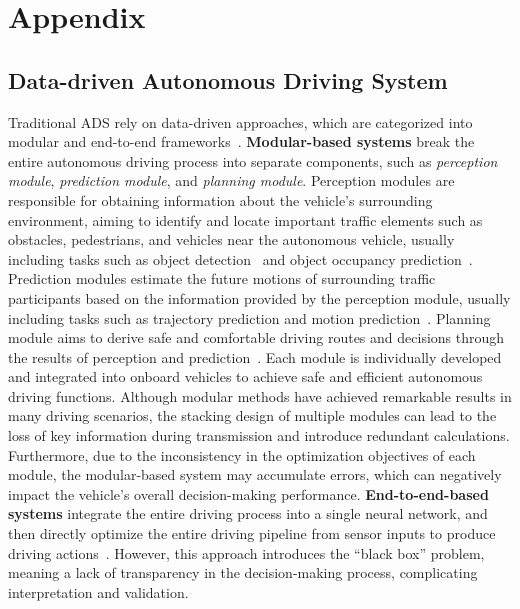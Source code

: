 \section{Appendix}
\label{sec:appendix}

\subsection{Data-driven Autonomous Driving System}
\label{app:Data-driven}
Traditional ADS rely on data-driven approaches, which are categorized into modular and end-to-end frameworks~\cite{chen2024end}. 
\textbf{Modular-based systems} break the entire autonomous driving process into separate components, such as \textit{perception module}, \textit{prediction module}, and \textit{planning module}.
Perception modules are responsible for obtaining information about the vehicle's surrounding environment, aiming to identify and locate important traffic elements such as obstacles, pedestrians, and vehicles near the autonomous vehicle, usually including tasks such as object detection~\cite{wang2021detrd} and object occupancy prediction~\cite{tong2023scene}.
Prediction modules estimate the future motions of surrounding traffic participants based on the information provided by the perception module, usually including tasks such as trajectory prediction and motion prediction~\cite{shi2022motion}.
Planning module aims to derive safe and comfortable driving routes and decisions through the results of perception and prediction~\cite{sauer2018conditional}.
Each module is individually developed and integrated into onboard vehicles to achieve safe and efficient autonomous driving functions. 
Although modular methods have achieved remarkable results in many driving scenarios, the stacking design of multiple modules can lead to the loss of key information during transmission and introduce redundant calculations. 
Furthermore, due to the inconsistency in the optimization objectives of each module, the modular-based system may accumulate errors, which can negatively impact the vehicle's overall decision-making performance.
\textbf{End-to-end-based systems} integrate the entire driving process into a single neural network, and then directly optimize the entire driving pipeline from sensor inputs to produce driving actions~\cite{chen2024end}.
However, this approach introduces the “black box” problem, meaning a lack of transparency in the decision-making process, complicating interpretation and validation.

